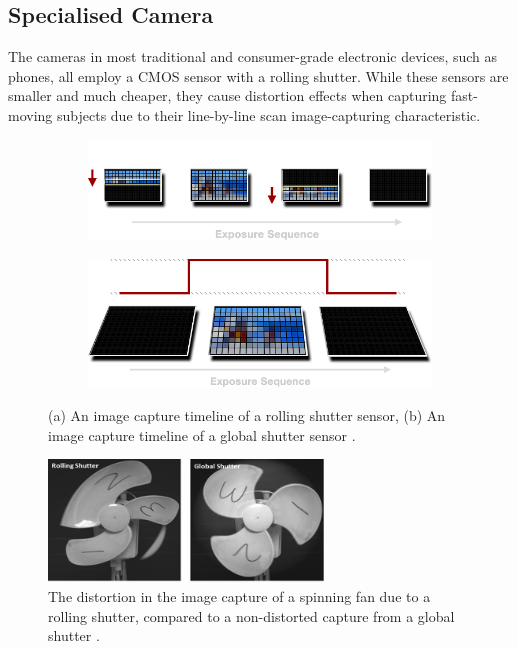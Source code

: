 \subsection{Specialised Camera}
The cameras in most traditional and consumer-grade electronic devices, such as phones, all employ a CMOS sensor with a rolling shutter. While these sensors are smaller and much cheaper, they cause distortion effects when capturing fast-moving subjects due to their line-by-line scan image-capturing characteristic. 

\begin{figure}[h]
    \centering
    \begin{subfigure}{.49\textwidth}
        \centering
        \includegraphics[width=1\linewidth]{assets/rolling-shutter-timeline.png}
        \caption{}
    \end{subfigure}
    \hfill
    \begin{subfigure}{.49\textwidth}
        \centering
        \includegraphics[width=1\linewidth]{assets/global-shutter-timeline.png}
        \caption{}
    \end{subfigure}
    \caption{(a) An image capture timeline of a rolling shutter sensor, (b) An image capture timeline of a global shutter sensor \cite{reddigitalcinemaGlobalRollingShutters}.}
    \label{fig:rs_gs_timelines}
\end{figure}

\begin{figure}[h]
    \centering
    \includegraphics[width=0.65\textwidth]{assets/rolling-vs-global-shutter.jpeg}
    \caption{The distortion in the image capture of a spinning fan due to a rolling shutter, compared to a non-distorted capture from a global shutter \cite{RollingShutterVs}.}
    \label{fig:rs_vs_gs}
\end{figure}

